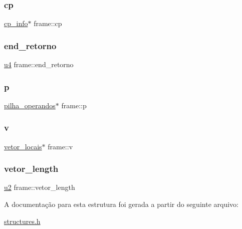 \subsubsection{\texorpdfstring{cp}{cp}}
{\footnotesize\ttfamily \hyperlink{structcp__info}{cp\+\_\+info}$\ast$ frame\+::cp}

\mbox{\label{structframe_a5d2f3ff696847f4147ff799395a331fc}} 
\subsubsection{\texorpdfstring{end\+\_\+retorno}{end\_retorno}}
{\footnotesize\ttfamily \hyperlink{lista__operandos_8h_ae5be1f726785414dd1b77d60df074c9d}{u4} frame\+::end\+\_\+retorno}

\mbox{\label{structframe_a6aa3e7c39989aa1477fd946643f521fe}} 
\subsubsection{\texorpdfstring{p}{p}}
{\footnotesize\ttfamily \hyperlink{structpilha__operandos}{pilha\+\_\+operandos}$\ast$ frame\+::p}

\mbox{\label{structframe_a01ae11b1517de21c420c3c9a6a267401}} 
\subsubsection{\texorpdfstring{v}{v}}
{\footnotesize\ttfamily \hyperlink{structvetor__locais}{vetor\+\_\+locais}$\ast$ frame\+::v}

\mbox{\label{structframe_aec98a2c044409e921f45ac926ace588e}} 
\subsubsection{\texorpdfstring{vetor\+\_\+length}{vetor\_length}}
{\footnotesize\ttfamily \hyperlink{lista__operandos_8h_a732cde1300aafb73b0ea6c2558a7a54f}{u2} frame\+::vetor\+\_\+length}



A documentação para esta estrutura foi gerada a partir do seguinte arquivo\+:\begin{DoxyCompactItemize}
\item 
\hyperlink{structures_8h}{structures.\+h}\end{DoxyCompactItemize}
